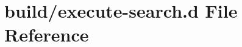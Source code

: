 \hypertarget{execute-search_8d}{}\section{build/execute-\/search.d File Reference}
\label{execute-search_8d}
